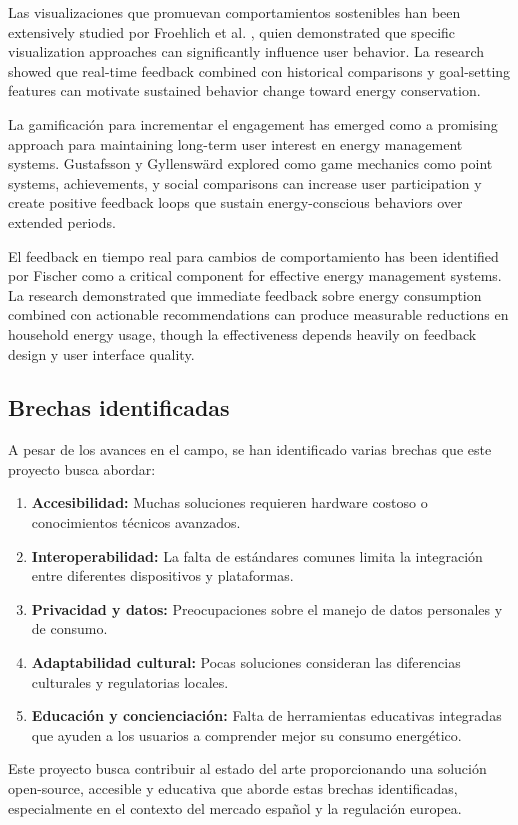 Las visualizaciones que promuevan comportamientos sostenibles han been extensively studied por Froehlich et al. \cite{froehlich2010sensing}, quien demonstrated que specific visualization approaches can significantly influence user behavior. La research showed que real-time feedback combined con historical comparisons y goal-setting features can motivate sustained behavior change toward energy conservation.

La gamificación para incrementar el engagement has emerged como a promising approach para maintaining long-term user interest en energy management systems. Gustafsson y Gyllenswärd \cite{gustafsson2009power} explored como game mechanics como point systems, achievements, y social comparisons can increase user participation y create positive feedback loops que sustain energy-conscious behaviors over extended periods.

El feedback en tiempo real para cambios de comportamiento has been identified por Fischer \cite{fischer2008feedback} como a critical component for effective energy management systems. La research demonstrated que immediate feedback sobre energy consumption combined con actionable recommendations can produce measurable reductions en household energy usage, though la effectiveness depends heavily on feedback design y user interface quality.

\subsection{Brechas identificadas}

A pesar de los avances en el campo, se han identificado varias brechas que este proyecto busca abordar:

\begin{enumerate}
    \item \textbf{Accesibilidad:} Muchas soluciones requieren hardware costoso o conocimientos técnicos avanzados.
    
    \item \textbf{Interoperabilidad:} La falta de estándares comunes limita la integración entre diferentes dispositivos y plataformas.
    
    \item \textbf{Privacidad y datos:} Preocupaciones sobre el manejo de datos personales y de consumo.
    
    \item \textbf{Adaptabilidad cultural:} Pocas soluciones consideran las diferencias culturales y regulatorias locales.
    
    \item \textbf{Educación y concienciación:} Falta de herramientas educativas integradas que ayuden a los usuarios a comprender mejor su consumo energético.
\end{enumerate}

Este proyecto busca contribuir al estado del arte proporcionando una solución open-source, accesible y educativa que aborde estas brechas identificadas, especialmente en el contexto del mercado español y la regulación europea.
